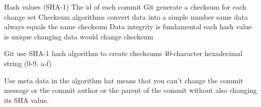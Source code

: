 Hash values (SHA-1)
  The id of each commit 
  Git generate a checksum for each change set
  Checksum algorithms convert data into a simple number 
  same data always equals the same checksum  
  Data integrity is fundamental 
  each hash value is unique 
  changing data would change checksum 

  Git use SHA-1 hash algorithm to create checksums 
  40-character hexadecimal string (0-9, a-f)

  Use meta data in the algorithm
  hat means that you can't change the commit message 
  or the commit author or the parent of the commit 
  without also changing its SHA value.  